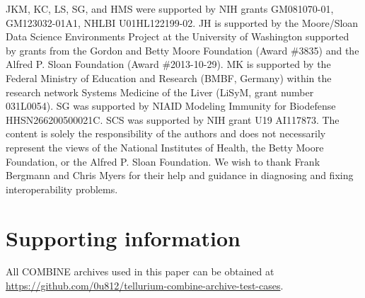 \documentclass[10pt,letterpaper]{article}
\newcommand{\beginsupplement}{%
        \setcounter{table}{0}
        \renewcommand{\thetable}{S\arabic{table}}%
        \setcounter{figure}{0}
        \renewcommand{\thefigure}{S\arabic{figure}}%
     }
\begin{document}
JKM, KC, LS, SG, and HMS were supported by NIH grants GM081070-01, GM123032-01A1, NHLBI U01HL122199-02. JH is supported by the Moore/Sloan Data Science Environments Project at the University of Washington supported by grants from the Gordon and Betty Moore Foundation (Award \#3835) and the Alfred P. Sloan Foundation (Award \#2013-10-29). MK is supported by the Federal Ministry of Education and Research (BMBF, Germany) within the research network Systems Medicine of the Liver (LiSyM, grant number 031L0054). SG was supported by NIAID Modeling Immunity for Biodefense HHSN266200500021C. SCS was supported by NIH grant U19 AI117873. The content is solely the responsibility of the authors and does not necessarily represent the views of the National Institutes of Health, the Betty Moore Foundation, or the Alfred P. Sloan Foundation. We wish to thank Frank Bergmann and Chris Myers for their help and guidance in diagnosing and fixing interoperability problems.

\section*{Supporting information}


All COMBINE archives used in this paper can be obtained at \href{https://github.com/0u812/tellurium-combine-archive-test-cases}{https://github.com/0u812/tellurium-combine-archive-test-cases}.


\beginsupplement

\end{document}
